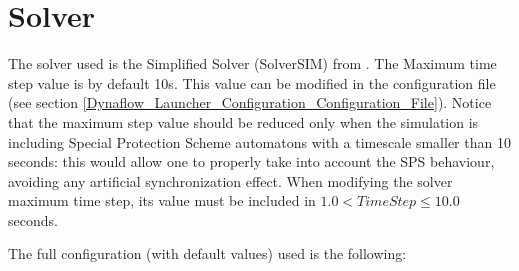 \documentclass[a4paper, 12pt]{report}
\begin{document}
\section{Solver}

The solver used is the Simplified Solver (SolverSIM) from \Dynawo.
The Maximum time step value is by default 10s. This value can be modified in the configuration file (see section \ref{Dynaflow_Launcher_Configuration_Configuration_File}).
Notice that the maximum step value should be reduced only when the simulation is including
Special Protection Scheme automatons with a timescale smaller than 10 seconds: this would allow one to properly
take into account the SPS behaviour, avoiding any artificial synchronization effect. When modifying the
solver maximum time step, its value must be included in $ 1.0  < TimeStep \leq 10.0 $ seconds.

The full configuration (with default values) used is the following:


\end{document}
